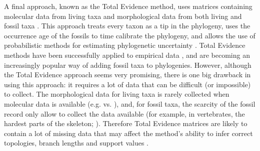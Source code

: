 \documentclass[12pt,letterpaper]{article}
\begin{document}
A final approach, known as the Total Evidence method, uses matrices containing molecular data from living taxa and morphological data from both living and fossil taxa \citep{eernissetaxonomic1993}. %
This approach treats every taxon as a tip in the phylogeny, uses the occurrence age of the fossils to time calibrate the phylogeny, and allows the use of probabilistic methods for estimating phylogenetic uncertainty \citep{ronquista2012}.
Total Evidence methods have been successfully applied to empirical data \citep{pyrondivergence2011,ronquista2012,schragocombining2013}, and are becoming an increasingly popular way of adding fossil taxa to phylogenies.
However, although the Total Evidence approach seems very promising, there is one big drawback in using this approach: it requires a lot of data that can be difficult (or impossible) to collect.
The morphological data for living taxa is rarely collected when molecular data is available (e.g. \citealt{O'Leary08022013} vs. \citealt{meredithimpacts2011}),%
 and, for fossil taxa, the scarcity of the fossil record only allow to collect the data available (for example, in vertebrates, the hardest parts of the skeleton; \citealt{sansomfossilization2013}).
Therefore Total Evidence matrices are likely to contain a lot of missing data that may affect the method's ability to infer correct topologies, branch lengths and support values \citep{salamin2003}. %

\end{document}
